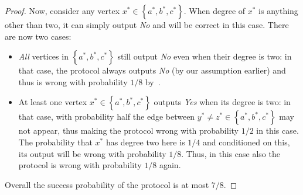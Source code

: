 \documentclass[11pt]{article}
\theoremstyle{definition}
\newcommand{\set}[1]{\ensuremath{\left\{ #1 \right\}}}
\newcommand{\prot}{\ensuremath{\pi}}
\newcommand{\suc}{\ensuremath{\textnormal{\textsf{suc}}}}
\newcommand{\xstar}{\ensuremath{x^{*}}}
\newcommand{\ystar}{\ensuremath{y^{*}}}
\newcommand{\zstar}{\ensuremath{z^{*}}}
\newcommand{\astar}{\ensuremath{a^*}}
\newcommand{\bstar}{\ensuremath{b^*}}
\newcommand{\cstar}{\ensuremath{c^*}}
\begin{document}
\begin{proof}
	Now, consider any vertex $\xstar \in \set{\astar,\bstar,\cstar}$. When degree of $\xstar$ is anything other than two, it can simply output \emph{No} and will be correct in this case. There are now two cases: 
	\begin{itemize}
		\item \emph{All} vertices in $\set{\astar,\bstar,\cstar}$ still output \emph{No} even when their degree is two: in that case, the protocol always outputs \emph{No} (by our assumption earlier) and thus is wrong with probability $1/8$ by~. 
		\item At least one vertex $\xstar \in \set{\astar,\bstar,\cstar}$ outputs \emph{Yes} when its degree is two: in that case, with probability half the edge between $\ystar \neq \zstar \in \set{\astar,\bstar,\cstar}$ may not appear, thus making
		the protocol wrong with probability $1/2$ in this case. The probability that $\xstar$ has degree two here is $1/4$ and conditioned on this, its output will be wrong with probability $1/8$. Thus, in this case also the protocol 
		is wrong with probability $1/8$ again. 
	\end{itemize}
	Overall the success probability of the protocol is at most $7/8$. 

\end{proof}
\end{document}
